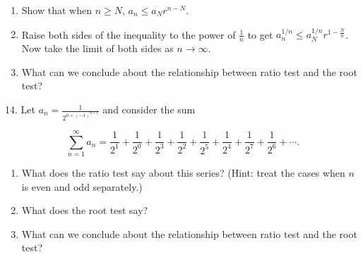\documentclass{article}
\begin{document}
\begin{enumerate}

	\item Show that when $n \geq N$, $a_n \leq a_N r^{n - N}$.

	\item Raise both sides of the inequality to the power of $\frac{1}{n}$ to get $a_n^{1/n} \leq a_N^{1/n} r^{1 - \frac{N}{n}}$. Now take the limit of both sides as $n \to \infty$.

	\item What can we conclude about the relationship between ratio test and the root test?

\end{enumerate}

14. Let $\displaystyle a_n = \frac{1}{2^{n + (-1)^{n + 1}}}$ and consider the sum

$$
	\sum_{n = 1}^\infty a_n = \frac{1}{2^1} + \frac{1}{2^0} + \frac{1}{2^3} + \frac{1}{2^2} + \frac{1}{2^5} + \frac{1}{2^4} + \frac{1}{2^7} + \frac{1}{2^6} + \cdots.
$$

\begin{enumerate}

	\item What does the ratio test say about this series? (Hint: treat the cases when $n$ is even and odd separately.)

	\item What does the root test say?

	\item What can we conclude about the relationship between ratio test and the root test?

\end{enumerate}
\end{document}
